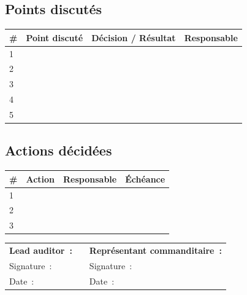 \documentclass[12pt,a4paper,oneside]{report}
\begin{document}
\subsection*{Points discut\'es}

\begin{table}[H]
\centering\small
\begin{tabularx}{\textwidth}{p{0.5cm}p{9cm}p{3cm}X}
\toprule
\rowcolor{theadcolor}
\color{white}\textbf{\#} &
\color{white}\textbf{Point discut\'e} &
\color{white}\textbf{D\'ecision / R\'esultat} &
\color{white}\textbf{Responsable} \\
\midrule
1 & & & \\[0.5cm]
2 & & & \\[0.5cm]
3 & & & \\[0.5cm]
4 & & & \\[0.5cm]
5 & & & \\
\bottomrule
\end{tabularx}
\end{table}

\subsection*{Actions d\'ecid\'ees}

\begin{table}[H]
\centering\small
\begin{tabularx}{\textwidth}{p{0.5cm}p{7cm}p{2.5cm}p{2.5cm}}
\toprule
\rowcolor{theadcolor}
\color{white}\textbf{\#} &
\color{white}\textbf{Action} &
\color{white}\textbf{Responsable} &
\color{white}\textbf{\'Ech\'eance} \\
\midrule
1 & & & \\[0.5cm]
2 & & & \\[0.5cm]
3 & & & \\
\bottomrule
\end{tabularx}
\end{table}

\vspace{0.5cm}

\begin{tabular}{p{5cm}p{3cm}p{5cm}}
\textbf{Lead auditor~:} & & \textbf{Repr\'esentant commanditaire~:} \\[1.5cm]
Signature~: \dotfill & & Signature~: \dotfill \\[0.3cm]
Date~: \dotfill & & Date~: \dotfill \\
\end{tabular}
\end{document}
